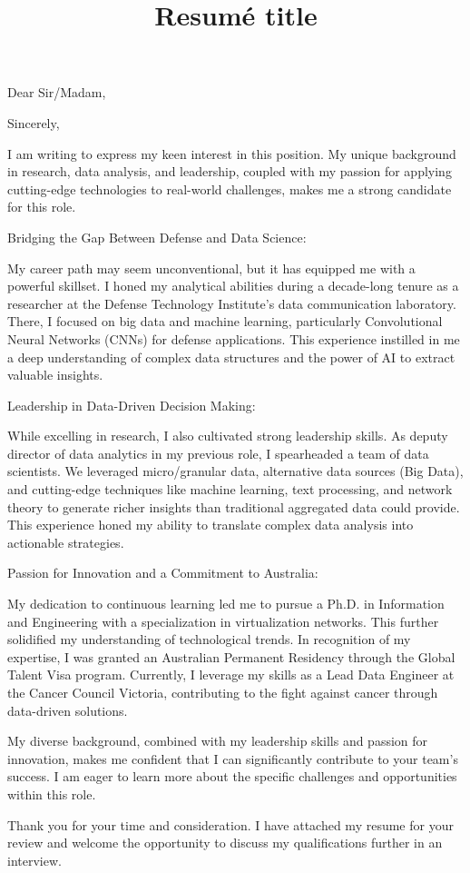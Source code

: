 \documentclass[11pt,a4paper,roman]{moderncv}        %
\title{Resumé title}                               %
\begin{document}
\recipient{}{}
\opening{Dear Sir/Madam,}
\closing{Sincerely,}
\makelettertitle

I am writing to express my keen interest in this position. My unique background in research, data analysis, and leadership, coupled with my passion for applying cutting-edge technologies to real-world challenges, makes me a strong candidate for this role.

Bridging the Gap Between Defense and Data Science:

My career path may seem unconventional, but it has equipped me with a powerful skillset. I honed my analytical abilities during a decade-long tenure as a researcher at the Defense Technology Institute's data communication laboratory. There, I focused on big data and machine learning, particularly Convolutional Neural Networks (CNNs) for defense applications. This experience instilled in me a deep understanding of complex data structures and the power of AI to extract valuable insights.

Leadership in Data-Driven Decision Making:

While excelling in research, I also cultivated strong leadership skills. As deputy director of data analytics in my previous role, I spearheaded a team of data scientists. We leveraged micro/granular data, alternative data sources (Big Data), and cutting-edge techniques like machine learning, text processing, and network theory to generate richer insights than traditional aggregated data could provide. This experience honed my ability to translate complex data analysis into actionable strategies.

Passion for Innovation and a Commitment to Australia:

My dedication to continuous learning led me to pursue a Ph.D. in Information and Engineering with a specialization in virtualization networks. This further solidified my understanding of technological trends. In recognition of my expertise, I was granted an Australian Permanent Residency through the Global Talent Visa program. Currently, I leverage my skills as a Lead Data Engineer at the Cancer Council Victoria, contributing to the fight against cancer through data-driven solutions.

My diverse background, combined with my leadership skills and passion for innovation, makes me confident that I can significantly contribute to your team's success. I am eager to learn more about the specific challenges and opportunities within this role.

Thank you for your time and consideration. I have attached my resume for your review and welcome the opportunity to discuss my qualifications further in an interview.


\vspace{0.5cm}


\makeletterclosing
\end{document}

